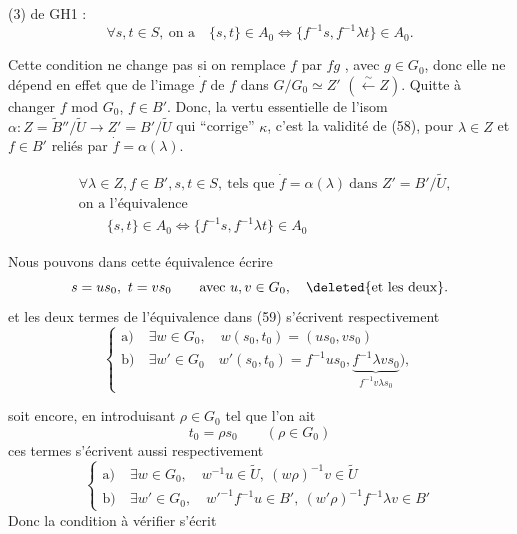 (3) de GH1 :
\[
\forall s,t\in S,\ \text{on a}\quad\{s,t\}\in A_0\Longleftrightarrow\{f^{-1}s,f^{-1}\lambda t\}\in A_0. \tag*{(58)}
\]

 Cette condition ne change pas si on  remplace $f$ par $fg$ , avec $g\in G_0$, donc elle ne dépend en effet que de l'image $\dot f$ de $f$ dans $G/G_0\simeq Z'$ $(\overset{\sim}{\leftarrow} Z)$. Quitte à changer $f$ mod $G_0$,  $f\in B'$. Donc, la vertu essentielle de l'isom $\alpha:Z=\widetilde B''/\widetilde U\longrightarrow Z'=B'/\widetilde U$ qui ``corrige'' $\kappa$, c'est la validité de (58), pour  $\lambda\in Z$ et $f\in B'$ reliés par $\dot f=\alpha(\lambda)$.

\[
\begin{aligned}
&\forall\lambda\in Z,f\in B',s,t\in S,\ \text{tels que }\dot f=\alpha(\lambda)\ \text{dans }Z'=B'/\widetilde U,\\
&\text{on a l'équivalence}\\
&\qquad \{s,t\}\in A_0\Longleftrightarrow\{f^{-1}s,f^{-1}\lambda t\}\in A_0
\end{aligned}\tag*{(59)}
\]

Nous pouvons dans cette équivalence écrire
\[
s=us_0,\ t=vs_0\qquad\text{avec }u,v\in G_0,\quad\deleted{\text{et les deux}}.
\]
et les deux termes de l'équivalence dans (59) s'écrivent respectivement
\[
\left\{\begin{aligned}
\text{a)}\ &\exists w\in G_0,\quad w(s_0,t_0)=(us_0,vs_0)\\
\text{b)}\ &\exists w'\in G_0\quad w'(s_0,t_0)= f^{-1}us_0,\underbrace{f^{-1}\lambda vs_0}_{f^{-1}v\lambda s_0}\bigr),
\end{aligned}\right. \tag*{(60)}
\]

soit encore, en introduisant $\rho\in G_0$ tel que l'on ait
\[
t_0=\rho s_0\qquad(\rho\in G_0) \tag*{(61)}
\]
ces termes s'écrivent aussi respectivement
\[
\left\{\begin{aligned}
\text{a)}\ &\exists w\in G_0,\quad w^{-1}u\in\widetilde U,\ (w\rho)^{-1}v\in\widetilde U\\
\text{b)}\ &\exists w'\in G_0,\quad w'^{-1}f^{-1}u\in B',\ (w'\rho)^{-1}f^{-1}\lambda v\in B'
\end{aligned}\right. \tag*{(62)}
\]
Donc la condition à vérifier s'écrit

